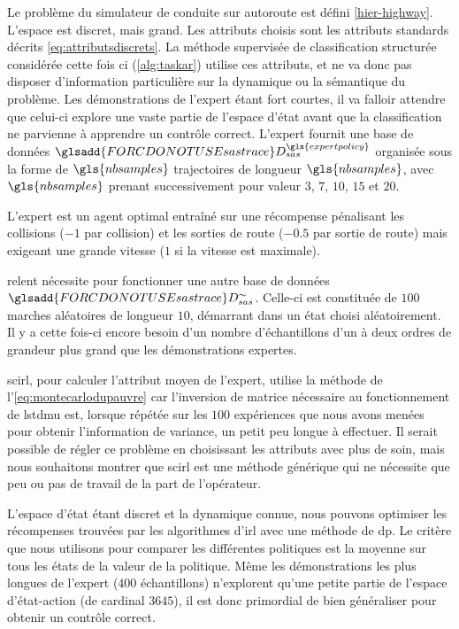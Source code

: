 \documentclass[frenchb,a4paper,justified,notoc]{tufte-book}
\newcommand{\nbsamples}{\gls{nbsamples}}
\newcommand{\expertpolicy}{\gls{expertpolicy}}
\newcommand{\sastrace}[1]{\ensuremath{\glsadd{FORCDONOTUSEsastrace}D_{sas}^{#1}}}
\begin{document}
    Le problème du simulateur de conduite sur autoroute est défini \autoref{hier-highway}. L'espace est discret, mais grand. Les attributs choisis sont les attributs standards décrits \autoref{eq:attributsdiscrets}. La méthode supervisée de classification structurée considérée cette fois ci (\autoref{alg:taskar}) utilise ces attributs, et ne va donc pas disposer d'information particulière sur la dynamique ou la sémantique du problème. Les démonstrations de l'expert étant fort courtes, il va falloir attendre que celui-ci explore une vaste partie de l'espace d'état avant que la classification ne parvienne à apprendre un contrôle correct. L'expert fournit une base de données $\sastrace{\expertpolicy}$ organisée sous la forme de $\nbsamples$ trajectoires de longueur $\nbsamples$, avec $\nbsamples$ prenant successivement pour valeur $3$, $7$, $10$, $15$ et $20$.

    L'expert est un agent optimal entraîné sur une récompense pénalisant les collisions ($-1$ par collision) et les sorties de route ($-0.5$ par sortie de route) mais exigeant une grande vitesse ($1$ si la vitesse est maximale). 
    
    \gls{relent} nécessite pour fonctionner une autre base de données $\sastrace{\sim}$. Celle-ci est constituée de $100$ marches aléatoires de longueur $10$, démarrant dans un état choisi aléatoirement. Il y a cette fois-ci encore besoin d'un nombre d'échantillons d'un à deux ordres de grandeur plus grand que les démonstrations expertes.
    
    \gls{scirl}, pour calculer l'attribut moyen de l'expert, utilise la méthode de l'\autoref{eq:montecarlodupauvre} car l'inversion de matrice nécessaire au fonctionnement de \gls{lstdmu} est, lorsque répétée sur les $100$ expériences que nous avons menées pour obtenir l'information de variance, un petit peu longue à effectuer. Il serait possible de régler ce problème en choisissant les attributs avec plus de soin, mais nous souhaitons montrer que \gls{scirl} est une méthode générique qui ne nécessite que peu ou pas de travail de la part de l'opérateur.
    
    L'espace d'état étant discret et la dynamique connue, nous pouvons optimiser les récompenses trouvées par les algorithmes d'\gls{irl} avec une méthode de \gls{dp}. Le critère que nous utilisons pour comparer les différentes politiques est la moyenne sur tous les états de la valeur de la politique. Même les démonstrations les plus longues de l'expert ($400$ échantillons) n'explorent qu'une petite partie de l'espace d'état-action (de cardinal $3645$), il est donc primordial de bien généraliser pour obtenir un contrôle correct.
\end{document}
